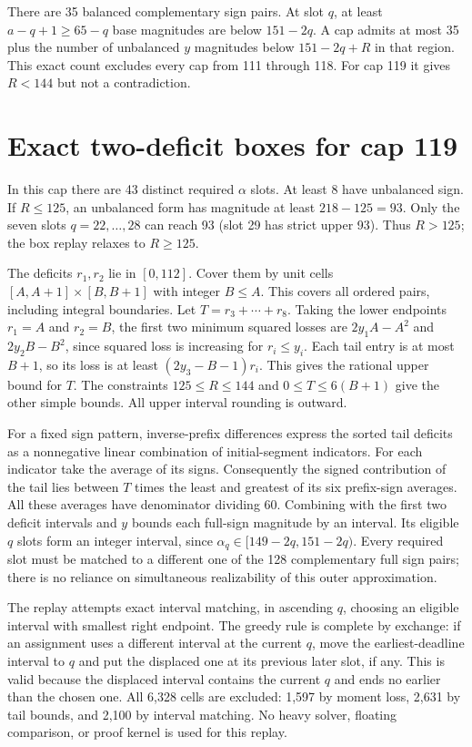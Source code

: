 \documentclass[11pt,letterpaper]{article}
\begin{document}
There are 35 balanced complementary sign pairs. At slot \(q\), at least
\(a-q+1\ge65-q\) base magnitudes are below \(151-2q\). A cap admits at
most 35 plus the number of unbalanced \(y\) magnitudes below
\(151-2q+R\) in that region. This exact count excludes every cap from
111 through 118. For cap 119 it gives \(R<144\) but not a contradiction.

\section{Exact two-deficit boxes for cap
119}\label{exact-two-deficit-boxes-for-cap-119}

In this cap there are 43 distinct required \(\alpha\) slots. At least 8
have unbalanced sign. If \(R\le125\), an unbalanced form has magnitude
at least \(218-125=93\). Only the seven slots \(q=22,\ldots,28\) can
reach 93 (slot 29 has strict upper 93). Thus \(R>125\); the box replay
relaxes to \(R\ge125\).

The deficits \(r_1,r_2\) lie in \([0,112]\). Cover them by unit cells
\([A,A+1]\times[B,B+1]\) with integer \(B\le A\). This covers all
ordered pairs, including integral boundaries. Let \(T=r_3+\cdots+r_8\).
Taking the lower endpoints \(r_1=A\) and \(r_2=B\), the first two
minimum squared losses are \(2y_1A-A^2\) and \(2y_2B-B^2\), since
squared loss is increasing for \(r_i\le y_i\). Each tail entry is at
most \(B+1\), so its loss is at least \((2y_3-B-1)r_i\). This gives the
rational upper bound for \(T\). The constraints \(125\le R\le144\) and
\(0\le T\le6(B+1)\) give the other simple bounds. All upper interval
rounding is outward.

For a fixed sign pattern, inverse-prefix differences express the sorted
tail deficits as a nonnegative linear combination of initial-segment
indicators. For each indicator take the average of its signs.
Consequently the signed contribution of the tail lies between \(T\)
times the least and greatest of its six prefix-sign averages. All these
averages have denominator dividing 60. Combining with the first two
deficit intervals and \(y\) bounds each full-sign magnitude by an
interval. Its eligible \(q\) slots form an integer interval, since
\(\alpha_q\in[149-2q,151-2q)\). Every required slot must be matched to a
different one of the 128 complementary full sign pairs; there is no
reliance on simultaneous realizability of this outer approximation.

The replay attempts exact interval matching, in ascending \(q\),
choosing an eligible interval with smallest right endpoint. The greedy
rule is complete by exchange: if an assignment uses a different interval
at the current \(q\), move the earliest-deadline interval to \(q\) and
put the displaced one at its previous later slot, if any. This is valid
because the displaced interval contains the current \(q\) and ends no
earlier than the chosen one. All 6,328 cells are excluded: 1,597 by
moment loss, 2,631 by tail bounds, and 2,100 by interval matching. No
heavy solver, floating comparison, or proof kernel is used for this
replay.
\end{document}
